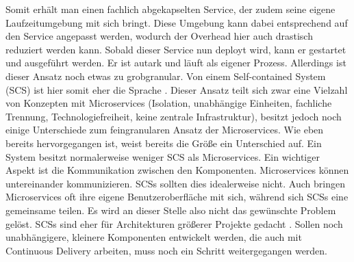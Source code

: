 Somit erhält man einen fachlich abgekapselten Service, der zudem seine eigene Laufzeitumgebung mit sich bringt. Diese Umgebung kann dabei entsprechend auf den Service angepasst werden, wodurch der Overhead hier auch drastisch reduziert werden kann. Sobald dieser Service nun deployt wird, kann er gestartet und ausgeführt werden. Er ist autark und läuft als eigener Prozess. Allerdings ist dieser Ansatz noch etwas zu grobgranular. Von einem Self-contained System (SCS) ist hier somit eher die Sprache \cite{jaxcenter.2016}. Dieser Ansatz teilt sich zwar eine Vielzahl von Konzepten mit Microservices (Isolation, unabhängige Einheiten, fachliche Trennung, Technologiefreiheit, keine zentrale Infrastruktur), besitzt jedoch noch einige Unterschiede zum feingranularen Ansatz der Microservices. Wie eben bereits hervorgegangen ist, weist bereits die Größe ein Unterschied auf. Ein System besitzt normalerweise weniger SCS als Microservices. Ein wichtiger Aspekt ist die Kommunikation zwischen den Komponenten. Microservices können untereinander kommunizieren. SCSs sollten dies idealerweise nicht. Auch bringen Microservices oft ihre eigene Benutzeroberfläche mit sich, während sich SCSs eine gemeinsame teilen. Es wird an dieser Stelle also nicht das gewünschte Problem gelöst. SCSs sind eher für Architekturen größerer Projekte gedacht \cite{selfcontainedservices.2017}. Sollen noch unabhängigere, kleinere Komponenten entwickelt werden, die auch mit Continuous Delivery arbeiten, muss noch ein Schritt weitergegangen werden. 